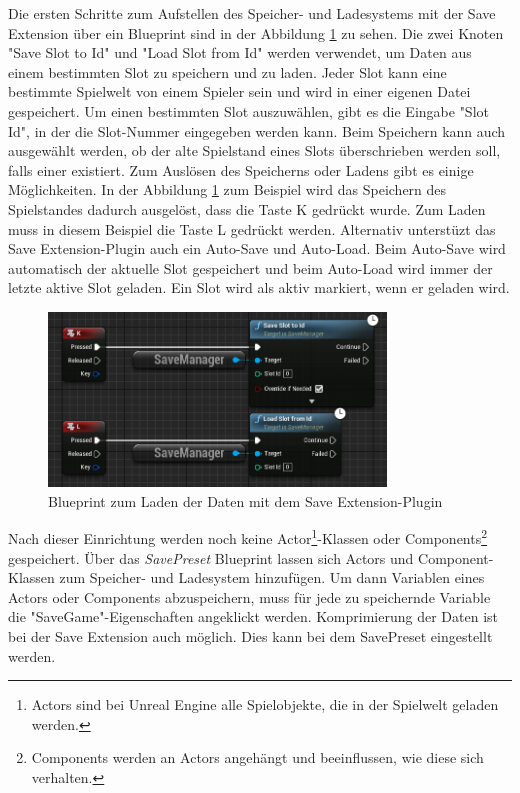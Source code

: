 Die ersten Schritte zum Aufstellen des Speicher- und Ladesystems mit der Save Extension über ein Blueprint sind in der Abbildung \ref{fig:unrealSaveExtensionBlueprint} zu sehen. Die zwei Knoten "Save Slot to Id" und "Load Slot from Id" werden verwendet, um Daten aus einem bestimmten Slot zu speichern und zu laden. Jeder Slot kann eine bestimmte Spielwelt von einem Spieler sein und wird in einer eigenen Datei gespeichert.\cite{piperiftPiperiftSaveSlot} Um einen bestimmten Slot auszuwählen, gibt es die Eingabe "Slot Id", in der die Slot-Nummer eingegeben werden kann. Beim Speichern kann auch ausgewählt werden, ob der alte Spielstand eines Slots überschrieben werden soll, falls einer existiert. Zum Auslösen des Speicherns oder Ladens gibt es einige Möglichkeiten. In der Abbildung \ref{fig:unrealSaveExtensionBlueprint} zum Beispiel wird das Speichern des Spielstandes dadurch ausgelöst, dass die Taste K gedrückt wurde. Zum Laden muss in diesem Beispiel die Taste L gedrückt werden. Alternativ unterstüzt das Save Extension-Plugin auch ein Auto-Save und Auto-Load. Beim Auto-Save wird automatisch der aktuelle Slot gespeichert und beim Auto-Load wird immer der letzte aktive Slot geladen. Ein Slot wird als aktiv markiert, wenn er geladen wird.\cite{piperiftPiperiftSaveSlot}\cite{piperiftPiperiftSaveBlueprint} 

\begin{figure}[htp]
    \centering
    \includegraphics[width=0.8\textwidth]{images/SaveExtension_load_save_blueprint.png}
    \caption{Blueprint zum Laden der Daten mit dem Save Extension-Plugin \cite{piperiftPiperiftSaveBlueprint}}
    \label{fig:unrealSaveExtensionBlueprint}
\end{figure}

Nach dieser Einrichtung werden noch keine Actor\footnote{Actors sind bei Unreal Engine alle Spielobjekte, die in der Spielwelt geladen werden.\cite{unrealengineActors}}-Klassen oder Components\footnote{Components werden an Actors angehängt und beeinflussen, wie diese sich verhalten.\cite{unrealengineActors}} gespeichert. Über das \textit{SavePreset} Blueprint lassen sich Actors und Component-Klassen zum Speicher- und Ladesystem hinzufügen. Um dann Variablen eines Actors oder Components abzuspeichern, muss für jede zu speichernde Variable die "SaveGame"-Eigenschaften angeklickt werden. Komprimierung der Daten ist bei der Save Extension auch möglich. Dies kann bei dem SavePreset eingestellt werden.

